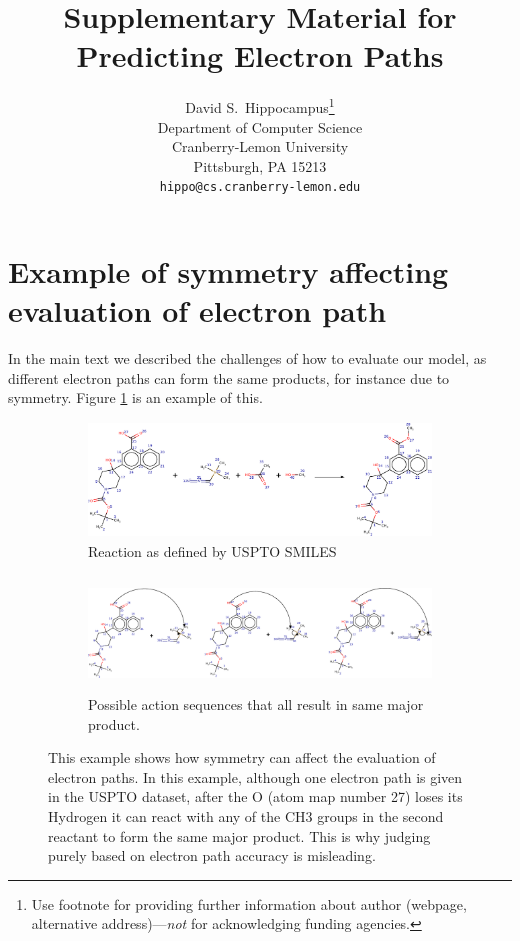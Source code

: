 \documentclass{article}
\title{Supplementary Material for Predicting Electron Paths}
\author{
  David S.~Hippocampus\thanks{Use footnote for providing further
    information about author (webpage, alternative
    address)---\emph{not} for acknowledging funding agencies.} \\
  Department of Computer Science\\
  Cranberry-Lemon University\\
  Pittsburgh, PA 15213 \\
  \texttt{hippo@cs.cranberry-lemon.edu} \\
}
\begin{document}
\maketitle


\section{Example of symmetry affecting evaluation of electron path}
In the main text we described the challenges of how to evaluate our model, as different electron paths can form the same products, for instance due to symmetry.
Figure \ref{fig:symmetric-reaction-example} is an example of this.


\begin{figure}[h]

    \centering
    \begin{subfigure}[b]{0.8\textwidth}
        \centering
        \includegraphics[height=1.2in]{imgs/reaction}
        \caption{Reaction as defined by USPTO SMILES}
    \end{subfigure}
    
    \par\bigskip %
    \begin{subfigure}[b]{0.8\textwidth}
        \centering
        \includegraphics[height=1.2in]{imgs/routes}
        \caption{Possible action sequences that all result in same major product.}
    \end{subfigure}
    \caption{This example shows how symmetry can affect the evaluation of electron paths. In this example, although one electron path is given in the USPTO dataset, after the O (atom map number 27) loses its Hydrogen it can react with any of the CH3 groups in the second reactant to form the same major product. This is why judging purely based on electron path accuracy is misleading.}
    \label{fig:symmetric-reaction-example}
\end{figure}
\end{document}

